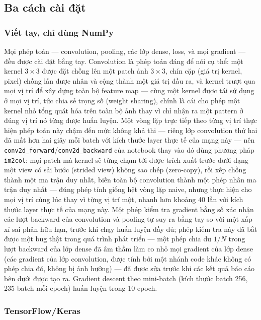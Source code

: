 \documentclass[11pt]{article}
\newcommand{\code}[1]{\texttt{#1}}
\begin{document}
\subsection{Ba cách cài đặt}

\subsubsection{Viết tay, chỉ dùng NumPy}

Mọi phép toán — convolution, pooling, các lớp dense, loss, và mọi gradient
— đều được cài đặt bằng tay. Convolution là phép toán đáng để nói cụ thể:
một kernel $3\times3$ được đặt chồng lên một patch ảnh $3\times3$, chín cặp
(giá trị kernel, pixel) chồng lấn được nhân và cộng thành một giá trị đầu
ra, và kernel trượt qua mọi vị trí để xây dựng toàn bộ feature map — cùng
một kernel được tái sử dụng ở mọi vị trí, tức chia sẻ trọng số (weight
sharing), chính là cái cho phép một kernel nhỏ tổng quát hóa trên toàn bộ
ảnh thay vì chỉ nhận ra một pattern ở đúng vị trí nó từng được huấn luyện.
Một vòng lặp trực tiếp theo từng vị trí thực hiện phép toán này chậm đến
mức không khả thi — riêng lớp convolution thứ hai đã mất hơn hai giây mỗi
batch với kích thước layer thực tế của mạng này — nên
\code{conv2d\_forward}/\code{conv2d\_backward} của notebook thay vào đó
dùng phương pháp \code{im2col}: mọi patch mà kernel sẽ từng chạm tới được
trích xuất trước dưới dạng một view có sải bước (strided view) không sao
chép (zero-copy), rồi xếp chồng thành một ma trận duy nhất, biến toàn bộ
convolution thành một phép nhân ma trận duy nhất — đúng phép tính giống hệt
vòng lặp naive, nhưng thực hiện cho mọi vị trí cùng lúc thay vì từng vị trí
một, nhanh hơn khoảng 40 lần với kích thước layer thực tế của mạng này. Một
phép kiểm tra gradient bằng số xác nhận các lượt backward của convolution
và pooling tự suy ra bằng tay so với một xấp xỉ sai phân hữu hạn, trước khi
chạy huấn luyện đầy đủ; phép kiểm tra này đã bắt được một bug thật trong
quá trình phát triển — một phép chia dư $1/N$ trong lượt backward của lớp
dense đã âm thầm làm co nhỏ mọi gradient của lớp dense (các gradient của
lớp convolution, được tính bởi một nhánh code khác không có phép chia đó,
không bị ảnh hưởng) — đã được sửa trước khi các kết quả báo cáo bên dưới
được tạo ra. Gradient descent theo mini-batch (kích thước batch 256, 235
batch mỗi epoch) huấn luyện trong 10 epoch.

\subsubsection{TensorFlow/Keras}
\end{document}
